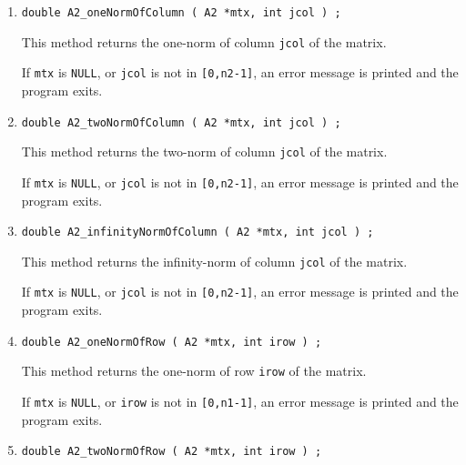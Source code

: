 \begin{enumerate}
\item
\begin{verbatim}
double A2_oneNormOfColumn ( A2 *mtx, int jcol ) ;
\end{verbatim}
This method returns the one-norm of column {\tt jcol} of the matrix.
\par {}
If {\tt mtx} is {\tt NULL}, or {\tt jcol} is not in {\tt [0,n2-1]},
an error message is printed and the program exits.
\item
\begin{verbatim}
double A2_twoNormOfColumn ( A2 *mtx, int jcol ) ;
\end{verbatim}
This method returns the two-norm of column {\tt jcol} of the matrix.
\par {}
If {\tt mtx} is {\tt NULL}, or {\tt jcol} is not in {\tt [0,n2-1]},
an error message is printed and the program exits.
\item
\begin{verbatim}
double A2_infinityNormOfColumn ( A2 *mtx, int jcol ) ;
\end{verbatim}
This method returns the infinity-norm of column {\tt jcol} 
of the matrix.
\par {}
If {\tt mtx} is {\tt NULL}, or {\tt jcol} is not in {\tt [0,n2-1]},
an error message is printed and the program exits.
\item
\begin{verbatim}
double A2_oneNormOfRow ( A2 *mtx, int irow ) ;
\end{verbatim}
This method returns the one-norm of row {\tt irow} of the matrix.
\par {}
If {\tt mtx} is {\tt NULL}, or {\tt irow} is not in {\tt [0,n1-1]},
an error message is printed and the program exits.
\item
\begin{verbatim}
double A2_twoNormOfRow ( A2 *mtx, int irow ) ;
\end{verbatim}

\end{enumerate}
